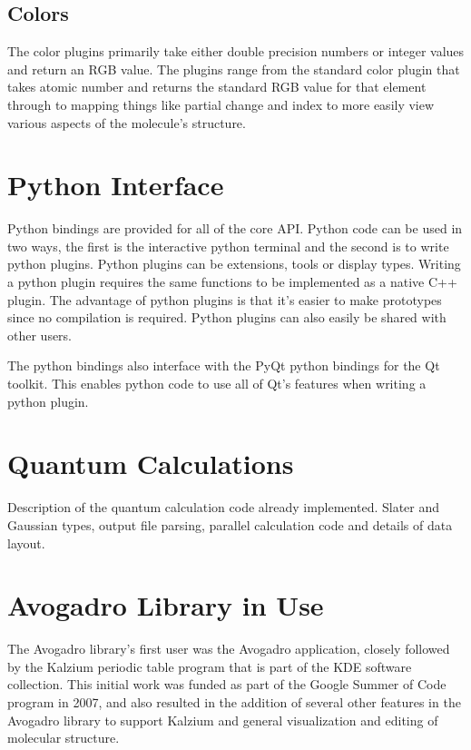 \documentclass[10pt]{bmc_article}
\newenvironment{bmcformat}{\begin{raggedright}
\baselineskip20pt\sloppy\setboolean{publ}{false}}{\end{raggedright}
\baselineskip20pt\sloppy}
\begin{document}
\begin{bmcformat}
\subsection{Colors} %

The color plugins primarily take either double precision numbers or integer
values and return an RGB value. The plugins range from the standard color
plugin that takes atomic number and returns the standard RGB value for that
element through to mapping things like partial change and index to more easily
view various aspects of the molecule's structure.

\section{Python Interface} %

Python bindings are provided for all of the core API. Python code can be used
in two ways, the first is the interactive python terminal and the second is to
write python plugins. Python plugins can be extensions, tools or display types.
Writing a python plugin requires the same functions to be implemented as a
native C++ plugin. The advantage of python plugins is that it's easier to make
prototypes since no compilation is required. Python plugins can also easily be
shared with other users.

The python bindings also interface with the PyQt python bindings for the Qt
toolkit. This enables python code to use all of Qt's features when writing a
python plugin.

\section{Quantum Calculations}

Description of the quantum calculation code already implemented. Slater and
Gaussian types, output file parsing, parallel calculation code and details of
data layout.

\section{Avogadro Library in Use}

The Avogadro library's first user was the Avogadro application, closely
followed by the Kalzium periodic table program that is part of the KDE software
collection. This initial work was funded as part of the Google Summer of Code
program in 2007, and also resulted in the addition of several other features in
the Avogadro library to support Kalzium and general visualization and editing
of molecular structure.


\end{bmcformat}
\end{document}
